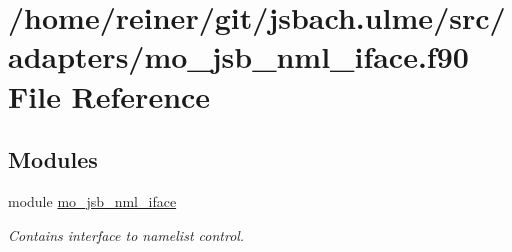 \hypertarget{mo__jsb__nml__iface_8f90}{}\section{/home/reiner/git/jsbach.ulme/src/adapters/mo\+\_\+jsb\+\_\+nml\+\_\+iface.f90 File Reference}
\label{mo__jsb__nml__iface_8f90}
\subsection*{Modules}
\begin{DoxyCompactItemize}
\item 
module \hyperlink{namespacemo__jsb__nml__iface}{mo\+\_\+jsb\+\_\+nml\+\_\+iface}
\begin{DoxyCompactList}\small\item\em Contains interface to namelist control. \end{DoxyCompactList}\end{DoxyCompactItemize}
